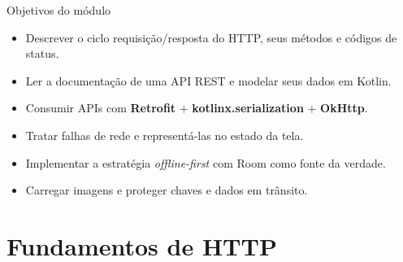 \documentclass[aspectratio=169,10pt]{beamer}
\begin{document}
\capa

\begin{frame}{Objetivos do módulo}
  \begin{conceito}
    \begin{itemize}
      \item Descrever o ciclo requisição/resposta do HTTP, seus métodos e códigos de status.
      \item Ler a documentação de uma API REST e modelar seus dados em Kotlin.
      \item Consumir APIs com \textbf{Retrofit} + \textbf{kotlinx.serialization} + \textbf{OkHttp}.
      \item Tratar falhas de rede e representá-las no estado da tela.
      \item Implementar a estratégia \emph{offline-first} com Room como fonte da verdade.
      \item Carregar imagens e proteger chaves e dados em trânsito.
    \end{itemize}
  \end{conceito}
\end{frame}

\sumario



\section{Fundamentos de HTTP}
\end{document}
